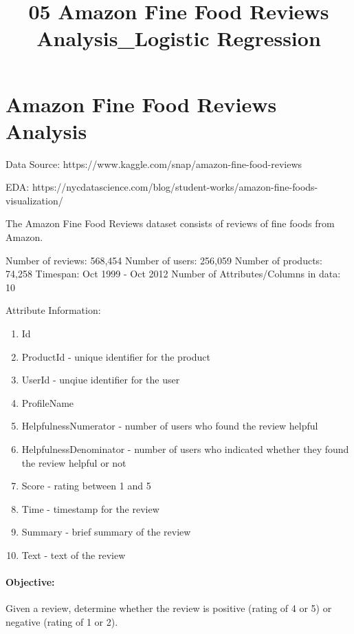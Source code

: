 \documentclass[11pt]{article}
\title{05 Amazon Fine Food Reviews Analysis\_Logistic Regression}
\providecommand{\tightlist}{%
      \setlength{\itemsep}{0pt}\setlength{\parskip}{0pt}}
\begin{document}
    
    
    \maketitle
    
    

    
    \section{Amazon Fine Food Reviews
Analysis}\label{amazon-fine-food-reviews-analysis}

Data Source: https://www.kaggle.com/snap/amazon-fine-food-reviews

EDA:
https://nycdatascience.com/blog/student-works/amazon-fine-foods-visualization/

The Amazon Fine Food Reviews dataset consists of reviews of fine foods
from Amazon.

Number of reviews: 568,454 Number of users: 256,059 Number of products:
74,258 Timespan: Oct 1999 - Oct 2012 Number of Attributes/Columns in
data: 10

Attribute Information:

\begin{enumerate}
\def\labelenumi{\arabic{enumi}.}
\tightlist
\item
  Id
\item
  ProductId - unique identifier for the product
\item
  UserId - unqiue identifier for the user
\item
  ProfileName
\item
  HelpfulnessNumerator - number of users who found the review helpful
\item
  HelpfulnessDenominator - number of users who indicated whether they
  found the review helpful or not
\item
  Score - rating between 1 and 5
\item
  Time - timestamp for the review
\item
  Summary - brief summary of the review
\item
  Text - text of the review
\end{enumerate}

\paragraph{Objective:}\label{objective}

Given a review, determine whether the review is positive (rating of 4 or
5) or negative (rating of 1 or 2).
\end{document}
